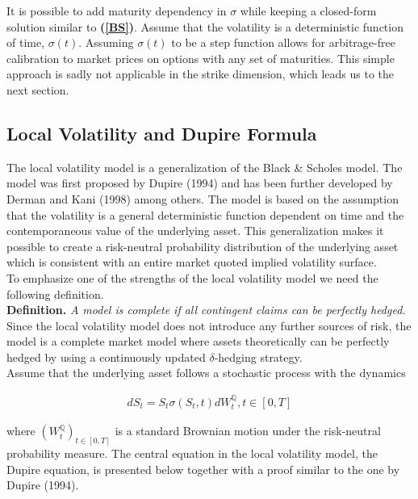 \documentclass[a4paper, 12pt]{article}
\numberwithin{equation}{subsection}
\begin{document}
It is possible to add maturity dependency in $\sigma$ while keeping a closed-form solution similar to \textbf{(\ref{BS})}. Assume that the volatility is a deterministic function of time, $\sigma(t)$. Assuming $\sigma(t)$ to be a step function allows for arbitrage-free calibration to market prices on options with any set of maturities. This simple approach is sadly not applicable in the strike dimension, which leads us to the next section.\\

\subsection{Local Volatility and Dupire Formula}
The local volatility model is a generalization of the Black \& Scholes model. The model was first proposed by Dupire (1994) and has been further developed by Derman and Kani (1998) among others. The model is based on the assumption that the volatility is a general deterministic function dependent on time and the contemporaneous value of the underlying asset. This generalization makes it possible to create a risk-neutral probability distribution of the underlying asset which is consistent with an entire market quoted implied volatility surface. \\

To emphasize one of the strengths of the local volatility model we need the following definition.\\

\textbf{Definition. } \textit{A model is complete if all contingent claims can be perfectly
hedged.}\\

Since the local volatility model does not introduce any further sources of risk,
the model is a complete market model where assets theoretically can be perfectly
hedged by using a continuously updated $\delta$-hedging strategy.\\

Assume that the underlying asset follows a stochastic process with the dynamics

\begin{align}\label{EQ1}
dS_t = S_t\sigma(S_t, t)dW^{\mathbb{Q}}_{t}, t \in [0,T]
\end{align} 

where $(W^{\mathbb{Q}}_{t} )_{t\in[0,T]}$ is a standard Brownian motion under the risk-neutral probability measure. The central equation in the local volatility model, the Dupire equation, is presented below together with a proof similar to the one by Dupire (1994).\\
\end{document}
